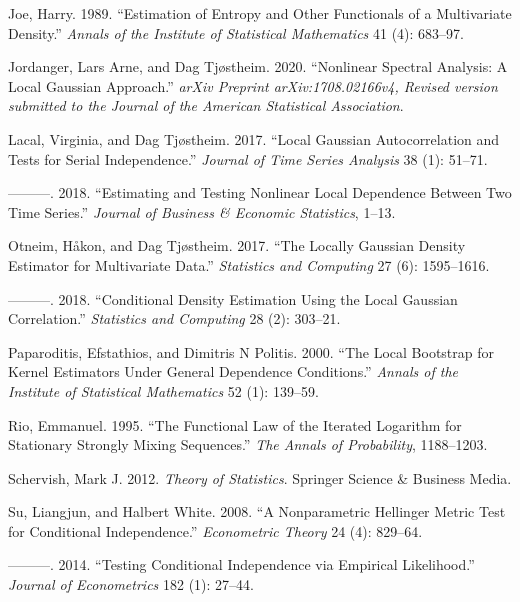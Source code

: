 \documentclass[
  12pt,
  letterpaper]{article}
\numberwithin{equation}{section}
\newlength{\cslhangindent}
\newenvironment{cslreferences}%
  {\setlength{\parindent}{0pt}%
  \everypar{\setlength{\hangindent}{\cslhangindent}}\ignorespaces}%
  {\par}
\begin{document}
\begin{cslreferences}
\leavevmode\hypertarget{ref-joe1989estimation}{}%
Joe, Harry. 1989. ``Estimation of Entropy and Other Functionals of a Multivariate Density.'' \emph{Annals of the Institute of Statistical Mathematics} 41 (4): 683--97.

\leavevmode\hypertarget{ref-jordanger2017nonlinear}{}%
Jordanger, Lars Arne, and Dag Tjøstheim. 2020. ``Nonlinear Spectral Analysis: A Local Gaussian Approach.'' \emph{arXiv Preprint arXiv:1708.02166v4, Revised version submitted to the Journal of the American Statistical Association}.

\leavevmode\hypertarget{ref-lacal2017local}{}%
Lacal, Virginia, and Dag Tjøstheim. 2017. ``Local Gaussian Autocorrelation and Tests for Serial Independence.'' \emph{Journal of Time Series Analysis} 38 (1): 51--71.

\leavevmode\hypertarget{ref-lacal2018estimating}{}%
---------. 2018. ``Estimating and Testing Nonlinear Local Dependence Between Two Time Series.'' \emph{Journal of Business \& Economic Statistics}, 1--13.

\leavevmode\hypertarget{ref-otneim2017locally}{}%
Otneim, Håkon, and Dag Tjøstheim. 2017. ``The Locally Gaussian Density Estimator for Multivariate Data.'' \emph{Statistics and Computing} 27 (6): 1595--1616.

\leavevmode\hypertarget{ref-otneim2017conditional}{}%
---------. 2018. ``Conditional Density Estimation Using the Local Gaussian Correlation.'' \emph{Statistics and Computing} 28 (2): 303--21.

\leavevmode\hypertarget{ref-paparoditis2000local}{}%
Paparoditis, Efstathios, and Dimitris N Politis. 2000. ``The Local Bootstrap for Kernel Estimators Under General Dependence Conditions.'' \emph{Annals of the Institute of Statistical Mathematics} 52 (1): 139--59.

\leavevmode\hypertarget{ref-rio1995functional}{}%
Rio, Emmanuel. 1995. ``The Functional Law of the Iterated Logarithm for Stationary Strongly Mixing Sequences.'' \emph{The Annals of Probability}, 1188--1203.

\leavevmode\hypertarget{ref-schervish1995theory}{}%
Schervish, Mark J. 2012. \emph{Theory of Statistics}. Springer Science \& Business Media.

\leavevmode\hypertarget{ref-su2008nonparametric}{}%
Su, Liangjun, and Halbert White. 2008. ``A Nonparametric Hellinger Metric Test for Conditional Independence.'' \emph{Econometric Theory} 24 (4): 829--64.

\leavevmode\hypertarget{ref-su2014testing}{}%
---------. 2014. ``Testing Conditional Independence via Empirical Likelihood.'' \emph{Journal of Econometrics} 182 (1): 27--44.


\end{cslreferences}
\end{document}
